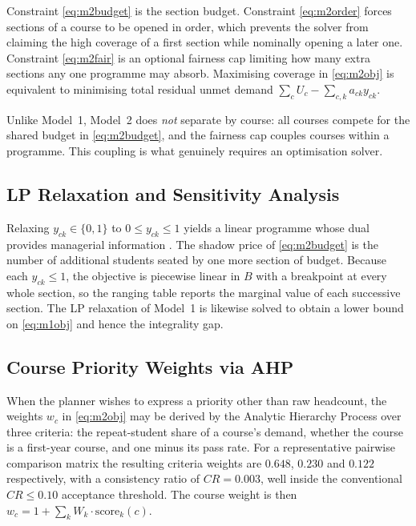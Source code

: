 \documentclass[conference]{IEEEtran}
\begin{document}
Constraint \eqref{eq:m2budget} is the section budget. Constraint \eqref{eq:m2order}
forces sections of a course to be opened in order, which prevents the solver from
claiming the high coverage of a first section while nominally opening a later one.
Constraint \eqref{eq:m2fair} is an optional fairness cap limiting how many extra sections
any one programme may absorb. Maximising coverage in \eqref{eq:m2obj} is equivalent to
minimising total residual unmet demand $\sum_c U_c - \sum_{c,k} a_{ck} y_{ck}$.

Unlike Model~1, Model~2 does \emph{not} separate by course: all courses compete for the
shared budget in \eqref{eq:m2budget}, and the fairness cap couples courses within a
programme. This coupling is what genuinely requires an optimisation solver.

\subsection{LP Relaxation and Sensitivity Analysis}

Relaxing $y_{ck} \in \{0,1\}$ to $0 \le y_{ck} \le 1$ yields a linear programme whose
dual provides managerial information \cite{dantzig}. The shadow price of \eqref{eq:m2budget} is the
number of additional students seated by one more section of budget. Because each
$y_{ck} \le 1$, the objective is piecewise linear in $B$ with a breakpoint at every whole
section, so the ranging table reports the marginal value of each successive section.
The LP relaxation of Model~1 is likewise solved to obtain a lower bound on
\eqref{eq:m1obj} and hence the integrality gap.

\subsection{Course Priority Weights via AHP}
\label{sec:ahp}

When the planner wishes to express a priority other than raw headcount, the weights
$w_c$ in \eqref{eq:m2obj} may be derived by the Analytic Hierarchy Process \cite{saaty} over three
criteria: the repeat-student share of a course's demand, whether the course is a
first-year course, and one minus its pass rate. For a representative pairwise comparison
matrix the resulting criteria weights are $0.648$, $0.230$ and $0.122$ respectively,
with a consistency ratio of $CR = 0.003$, well inside the conventional $CR \le 0.10$
acceptance threshold. The course weight is then
$w_c = 1 + \sum_k W_k \cdot \mathrm{score}_k(c)$.
\end{document}
